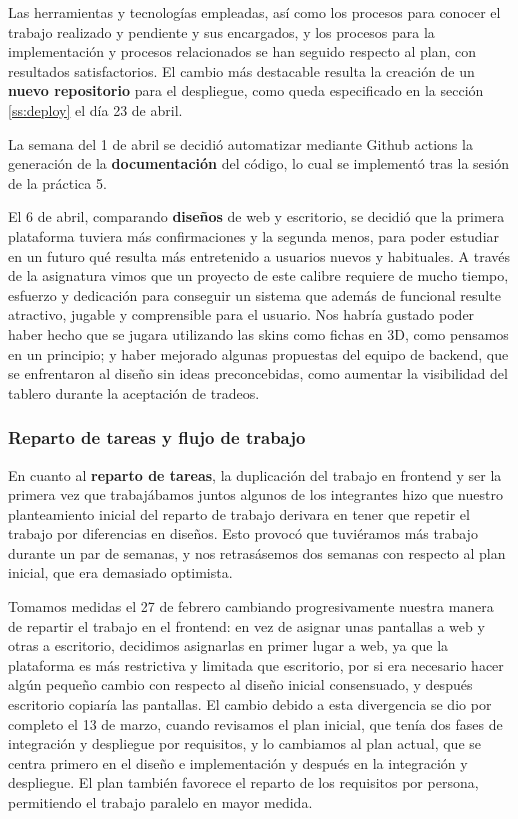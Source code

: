 \documentclass[11pt]{article}
\begin{document}
Las herramientas y tecnologías empleadas, así como los procesos para
conocer el trabajo realizado y pendiente y sus encargados, y los 
procesos para la implementación y procesos relacionados se han seguido 
respecto al plan, con resultados satisfactorios.
El cambio más destacable resulta la creación de un \textbf{nuevo repositorio} para 
el despliegue, como queda especificado en la sección \ref{ss:deploy}
el día 23 de abril.

La semana del 1 de abril 
se decidió automatizar mediante Github actions la generación
de la \textbf{documentación} del código, lo cual se implementó tras la sesión
de la práctica 5.

El 6 de abril, comparando \textbf{diseños} de web y escritorio, se decidió que la
primera plataforma tuviera más confirmaciones y la segunda menos, para
poder estudiar en un futuro qué resulta más entretenido a usuarios
nuevos y habituales. A través de la asignatura vimos que un proyecto de 
este calibre requiere de mucho tiempo, esfuerzo y dedicación para conseguir
un sistema que además de funcional resulte atractivo, jugable y comprensible
para el usuario. Nos habría gustado poder haber hecho que se jugara utilizando
las skins como fichas en 3D, como pensamos en un principio; y haber mejorado
algunas propuestas del equipo de backend, que se enfrentaron al diseño sin
ideas preconcebidas, como
aumentar la visibilidad del tablero durante la aceptación de tradeos.

\subsubsection{Reparto de tareas y flujo de trabajo}
En cuanto al \textbf{reparto de tareas}, la duplicación del trabajo en frontend
y ser la primera vez que trabajábamos juntos algunos de los integrantes
hizo que nuestro planteamiento inicial del reparto de trabajo derivara
en tener que repetir el trabajo por diferencias en diseños. Esto
provocó que tuviéramos más trabajo durante un par de semanas, y nos 
retrasásemos dos semanas con respecto al plan inicial, que era demasiado
optimista. 

Tomamos medidas el 27 de febrero cambiando progresivamente
nuestra manera de repartir el trabajo en el frontend: en vez de 
asignar unas pantallas a web y otras a escritorio, decidimos asignarlas
en primer lugar a web, ya que la plataforma es más restrictiva y limitada que
escritorio, por si era necesario hacer algún pequeño cambio con 
respecto al diseño inicial consensuado, y después escritorio copiaría
las pantallas. El cambio debido a esta divergencia se dio por completo el
13 de marzo, cuando revisamos el plan inicial, que tenía dos fases de
integración y despliegue por requisitos, y lo cambiamos al plan actual,
que se centra primero en el diseño e implementación y después en la integración y
despliegue. El plan también favorece el reparto de los requisitos por
persona, permitiendo el trabajo paralelo en mayor medida. 
\end{document}
